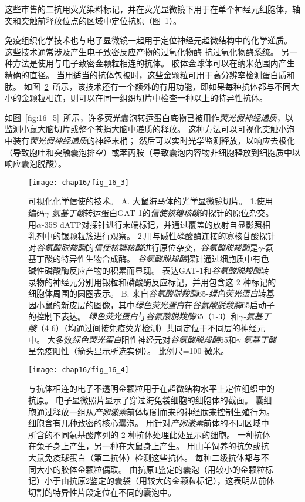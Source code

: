 \begin{proposition}[神经解剖学导航术语]
	\quad \quad 这些市售的二抗用荧光染料标记，并在荧光显微镜下用于在单个神经元细胞体，轴突和突触前释放位点的区域中定位抗原（图~\ref{fig:16_3}）。
	
	\quad \quad 免疫组织化学技术也与电子显微镜一起用于定位神经元超微结构中的化学递质。
	这些技术通常涉及产生电子致密反应产物的过氧化物酶-抗过氧化物酶系统。
	另一种方法是使用与电子致密金颗粒相连的抗体。
	胶体金球体可以在纳米范围内产生精确的直径。
	当用适当的抗体包被时，这些金颗粒可用于高分辨率检测蛋白质和肽。
	如图~\ref{fig:16_4}~所示，该技术还有一个额外的有用功能，即如果每种抗体都与不同大小的金颗粒相连，则可以在同一组织切片中检查一种以上的特异性抗体。
	
	\quad \quad 如图~\ref{fig:16_5}~所示，许多荧光囊泡转运蛋白底物已被用作\textit{荧光假神经递质}，以监测小鼠大脑切片或整个苍蝇大脑中递质的释放。
	这种方法可以可视化突触小泡中装有\textit{荧光假神经递质}的神经末梢；
	然后可以实时光学监测释放，以响应去极化（导致胞吐和突触囊泡排空）或苯丙胺（导致囊泡内容物非细胞释放到细胞质中以响应囊泡脱酸）。
	
\end{proposition}


\begin{figure}[htbp]
	\centering
	\texttt{[image: chap16/fig\_16\_3]}
	\caption{可视化化学信使的技术。
		A. 大鼠海马体的光学显微镜切片。
		1.使用编码\textit{$\gamma$-氨基丁酸}转运蛋白GAT-1的\textit{信使核糖核酸}的探针的原位杂交。
		用$\alpha$-35S dATP对探针进行末端标记，并通过覆盖的放射自显影照相乳剂中的银颗粒簇进行观察。
		2.用与碱性磷酸酶连接的寡核苷酸探针对\textit{谷氨酸脱羧酶}的\textit{信使核糖核酸}进行原位杂交，\textit{谷氨酸脱羧酶}是$\gamma$-氨基丁酸的特异性生物合成酶。
		\textit{谷氨酸脱羧酶}探针通过细胞质中有色碱性磷酸酶反应产物的积累而显现。
		表达GAT-1和\textit{谷氨酸脱羧酶}转录物的神经元分别用银粒和磷酸酶反应标记，并用包含这 2 种标记的细胞体周围的圆圈表示。
		B. 来自\textit{谷氨酸脱羧酶}65-\textit{绿色荧光蛋白}转基因小鼠的新皮层的图像，其中\textit{绿色荧光蛋白}在\textit{谷氨酸脱羧酶}65启动子的控制下表达。
		\textit{绿色荧光蛋白}与\textit{谷氨酸脱羧酶}65（1-3）和\textit{$\gamma$-氨基丁酸}（4-6）（均通过间接免疫荧光检测）共同定位于不同层的神经元中。
		大多数\textit{绿色荧光蛋白}阳性神经元对\textit{谷氨酸脱羧酶}65和\textit{$\gamma$-氨基丁酸}呈免疫阳性（箭头显示所选实例）。
		比例尺=100 微米。}
	\label{fig:16_3}
\end{figure}


\begin{figure}[htbp]
	\centering
	\texttt{[image: chap16/fig\_16\_4]}
	\caption{与抗体相连的电子不透明金颗粒用于在超微结构水平上定位组织中的抗原。
		电子显微照片显示了穿过海兔袋细胞的细胞体的截面。
		囊细胞通过释放一组从\textit{产卵激素}前体切割而来的神经肽来控制生殖行为。细胞含有几种致密的核心囊泡。
		用针对\textit{产卵激素}前体的不同区域中所含的不同氨基酸序列的 2 种抗体处理此处显示的细胞。
		一种抗体在兔子身上产生，另一种在大鼠身上产生。
		用山羊饲养的抗兔或抗大鼠免疫球蛋白（第二抗体）检测这些抗体。
		每种二级抗体都与不同大小的胶体金颗粒偶联。
		由抗原1鉴定的囊泡（用较小的金颗粒标记）小于由抗原2鉴定的囊袋（用较大的金颗粒标记），这表明从前体切割的特异性片段定位在不同的囊泡中。}
	\label{fig:16_4}
\end{figure}



